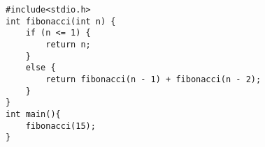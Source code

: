 \begin{lstlisting}[style=codigoC]
#include<stdio.h>
int fibonacci(int n) {
    if (n <= 1) {
        return n;
    }
    else {
        return fibonacci(n - 1) + fibonacci(n - 2);
    }
}
int main(){
    fibonacci(15);
}
\end{lstlisting}